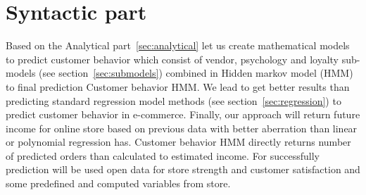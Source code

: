 
\chapter{Syntactic part} \label{sec:methodology}
Based on the Analytical part~\ref{sec:analytical} let us create  mathematical models to predict customer behavior which consist of
vendor, psychology and loyalty sub-models (see section~\ref {sec:submodels}) combined in Hidden markov model (HMM) to final prediction Customer behavior HMM.
We lead to get better results than predicting standard regression model methods (see section~\ref{sec:regression}) to predict customer behavior in e-commerce.
Finally, our approach will return future income for online store based on previous data with better aberration than linear or polynomial regression has.
Customer behavior HMM directly returns number of predicted orders than calculated to estimated income.
For successfully prediction will be used open data for store strength and customer satisfaction and some predefined and computed variables from store.

